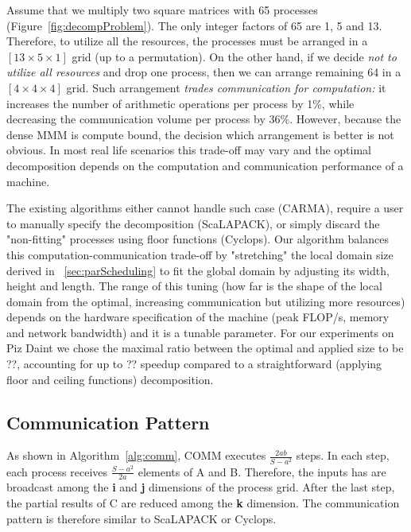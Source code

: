 \documentclass[sigplan,review,anonymous,10pt]{acmart}\settopmatter{printfolios=true,printccs=false,printacmref=false}
\begin{document}
Assume that we multiply two square matrices with 65 
processes (Figure~\ref{fig:decompProblem}). The only integer factors 
of 65 are 1, 5 and 13. Therefore, to 
utilize all the resources, the processes must be arranged in a $[13 
\times 5 \times 1]$ grid (up to a permutation). On the other hand, if 
we decide \emph{not to utilize all resources} 
and drop one process, then we can arrange remaining 64 in a $[4 
\times 4 \times 4]$ grid. Such arrangement \emph{trades communication 
	for computation:} it increases the number of arithmetic operations 
per process by 1\%, while decreasing the communication volume per 
process by 36\%. However, because the dense MMM is compute bound, the 
decision which arrangement is better is not obvious.
In most real life scenarios this trade-off may vary and the optimal 
decomposition depends on the computation and communication 
performance 
of a 
machine. 



The existing algorithms either cannot handle such case (CARMA), 
require a user to manually specify the decomposition (ScaLAPACK), or 
simply discard the "non-fitting" processes using floor functions 
(Cyclops). Our algorithm balances this computation-communication 
trade-off by "stretching" the local domain size 
derived in ~\cref{sec:parScheduling} to fit the global 
domain by adjusting its width, height and length. The range of this 
tuning (how far is the shape of the local domain from the optimal, 
increasing communication but utilizing more resources) 
depends on the hardware specification of the 
machine (peak FLOP/s, memory and network bandwidth) and it is a
tunable parameter. For our 
experiments on Piz Daint we chose the maximal ratio between the 
optimal and applied size to be ??, accounting for up to ?? speedup 
compared to a straightforward (applying floor and ceiling functions) 
decomposition.

\subsection{Communication Pattern}
\label{sec:commPattern}
As shown in Algorithm~\ref{alg:comm}, COMM executes $\frac{2ab}{S - a^2}$ 
steps. In each step, each process receives $\frac{S - a^2}{2a}$ elements of A 
and 
B. Therefore, the inputs has are broadcast among the \textbf{i} and \textbf{j} 
dimensions of the process grid. After the last step, the partial results of C 
are reduced among the \textbf{k} dimension. The communication pattern is 
therefore similar to ScaLAPACK or Cyclops.
\end{document}
